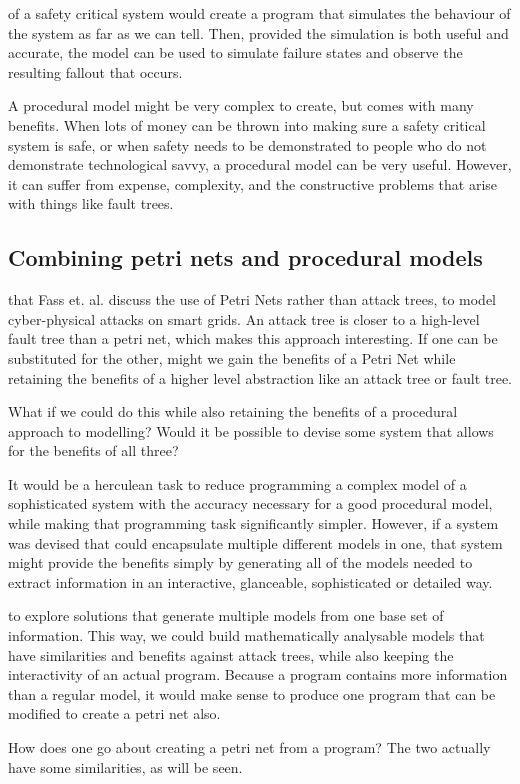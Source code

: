 \documentclass{tufte-handout}
\begin{document}
of a safety critical system would create a program that simulates the behaviour of the system as far as we can tell. Then, provided the simulation is both useful and accurate, the model can be used to simulate failure states and observe the resulting fallout that occurs. \par
{}A procedural model might be very complex to create, but comes with many benefits. When lots of money can be thrown into making sure a safety critical system is safe, or when safety needs to be demonstrated to people who do not demonstrate technological savvy, a procedural model can be very useful. However, it can suffer from expense, complexity, and the constructive problems that arise with things like fault trees. 

\subsection{Combining petri nets and procedural models}
 that Fass et. al.\cite{Fass2016} discuss the use of Petri Nets rather than attack trees, to model cyber-physical attacks on smart grids. An attack tree is closer to a high-level fault tree than a petri net, which makes this approach interesting. If one can be substituted for the other, might we gain the benefits of a Petri Net while retaining the benefits of a higher level abstraction like an attack tree or fault tree. \par
What if we could do this while also retaining the benefits of a procedural approach to modelling? Would it be possible to devise some system that allows for the benefits of all three?\par
{}It would be a herculean task to reduce programming a complex model of a sophisticated system with the accuracy necessary for a good procedural model, while making that programming task significantly simpler. However, if a system was devised that could encapsulate multiple different models in one, that system might provide the benefits simply by generating all of the models needed to extract information in an interactive, glanceable, sophisticated or detailed way. \par
{}to explore solutions that generate multiple models from one base set of information. This way, we could build mathematically analysable models that have similarities and benefits against attack trees, while also keeping the interactivity of an actual program. Because a program contains more information than a regular model, it would make sense to produce one program that can be modified to create a petri net also. \par
How does one go about creating a petri net from a program? The two actually have some similarities, as will be seen.
\end{document}
